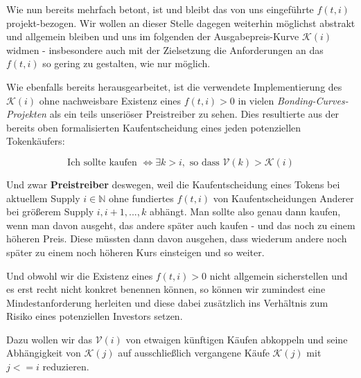 \vspace{0.3cm}

Wie nun bereits mehrfach betont, ist und bleibt das von uns eingeführte $f(t, i)$ projekt-bezogen. Wir wollen an dieser Stelle dagegen weiterhin möglichst abstrakt und allgemein bleiben und uns im folgenden der Ausgabepreis-Kurve $\mathcal{K} \left( i \right)$ widmen - insbesondere auch mit der Zielsetzung die Anforderungen an das $f(t, i)$ so gering zu gestalten, wie nur möglich.

Wie ebenfalls bereits herausgearbeitet, ist die verwendete Implementierung des $\mathcal{K} \left( i \right)$ ohne nachweisbare Existenz eines $f(t, i) > 0$ in vielen \textit{Bonding-Curves-Projekten} als ein teils unseriöser Preistreiber zu sehen. Dies resultierte aus der bereits oben formalisierten Kaufentscheidung eines jeden potenziellen Tokenkäufers:

\begin{equation*}
\textrm{Ich sollte kaufen   } \Leftrightarrow \exists k > i, \textrm{  so dass } \mathcal{V} \left( k \right) > \mathcal{K} \left( i \right)
\end{equation*} 

Und zwar \textbf{Preistreiber} deswegen, weil die Kaufentscheidung eines Tokens bei aktuellem Supply $i \in \mathbb{N}$ ohne fundiertes $f(t, i)$ von Kaufentscheidungen Anderer bei größerem Supply $i, i+1,...,k$ abhängt. Man sollte also genau dann kaufen, wenn man davon ausgeht, das andere später auch kaufen - und das noch zu einem höheren Preis. Diese müssten dann davon ausgehen, dass wiederum andere noch später zu einem noch höheren Kurs einsteigen und so weiter.

\vspace{0.2cm}


\vspace{0.5cm}

Und obwohl wir die Existenz eines $f(t, i) > 0$ nicht allgemein sicherstellen und es erst recht nicht konkret benennen können, so können wir zumindest eine Mindestanforderung herleiten und diese dabei zusätzlich ins Verhältnis zum Risiko eines potenziellen Investors setzen.

Dazu wollen wir das $\mathcal{V} \left( i \right)$ von etwaigen künftigen Käufen abkoppeln und seine Abhängigkeit von $\mathcal{K} \left( j \right)$ auf ausschließlich vergangene Käufe $\mathcal{K} \left( j \right)$ mit $j <= i$ reduzieren.

\vspace{0.3cm}

